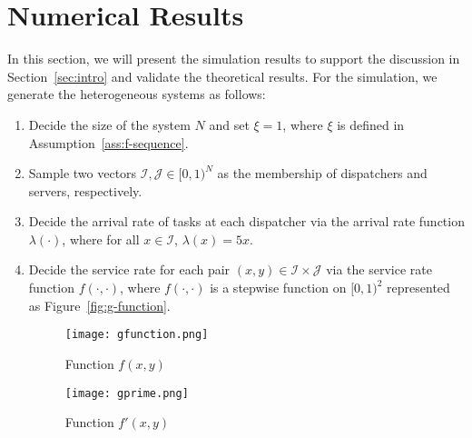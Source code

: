 \documentclass[11pt, reqno]{article}
\numberwithin{equation}{section}
\numberwithin{theorem}{section}
\begin{document}
\section{Numerical Results}\label{sec:numerical results}

In this section, we will present the simulation results to support the discussion in Section~\ref{sec:intro} and validate the theoretical results. 
For the simulation, we generate the heterogeneous systems as follows:
\begin{enumerate}[Step 1.]
    \item Decide the size of the system $N$ and set $\xi=1$, where $\xi$ is defined in Assumption~\ref{ass:f-sequence}. 
    \item Sample two vectors $\mathcal{I},\mathcal{J}\in[0,1)^N$ as the membership of dispatchers and servers, respectively.
    \item Decide the arrival rate of tasks at each dispatcher via the arrival rate function $\lambda(\cdot)$, where for all $x\in\mathcal{I}$, $\lambda(x)=5x.$
    \item Decide the service rate for each pair $(x,y)\in\mathcal{I}\times\mathcal{J}$ via the service rate function $f(\cdot,\cdot)$, where $f(\cdot,\cdot)$ is a stepwise function on $[0,1)^2$ represented as Figure~\ref{fig:g-function}.

    \begin{figure}[!htb]
    \centering
  \texttt{[image: gfunction.png]}
  \caption{Function $f(x,y)$}\label{fig:g-function}
\endminipage\hfill
{}\centering
  \texttt{[image: gprime.png]}
  \caption{Function $f'(x,y)$}\label{fig:g'-function}
\endminipage\hfill
\end{figure}
    
\end{enumerate}
\end{document}
